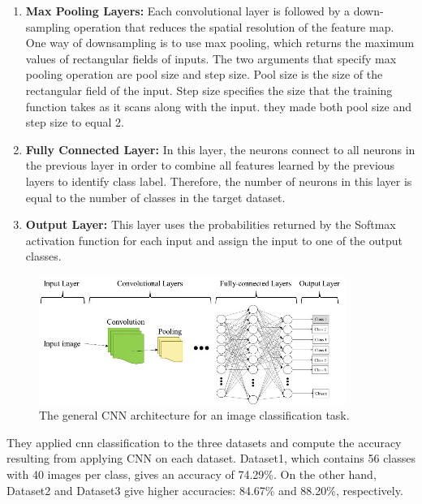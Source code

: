 \begin{itemize}[labelindent=1em,labelsep=0.25cm,leftmargin=*]
\begin{enumerate}
        \item {\textbf{Max Pooling Layers:}} 
Each convolutional layer is
followed by a down-sampling operation that reduces the
spatial resolution of the feature map. One way of downsampling
is to use max pooling, which returns the maximum
values of rectangular fields of inputs. The two arguments that
specify max pooling operation are pool size and step size.
Pool size is the size of the rectangular field of the input. Step
size specifies the size that the training function takes as it
scans along with the input. they made both pool size and step size
to equal 2.

        \item {\textbf{Fully Connected Layer:}} 
In this layer, the neurons
connect to all neurons in the previous layer in order to
combine all features learned by the previous layers to identify
class label. Therefore, the number of neurons in this layer is
equal to the number of classes in the target dataset.

        \item {\textbf{Output Layer:}} 
This layer uses the probabilities
returned by the Softmax activation function for each input
and assign the input to one of the output classes.
        \end{enumerate}
        
        \begin{figure}[!htb]
        \centering
        \includegraphics[width=10cm]{images/cnn_leyar.png}
        \caption{The general CNN architecture for an image classification task.}
        \label{fig:cnn_leyar}
        \end{figure}
        
    \end{itemize}
They applied \acrshort{cnn} classification to the three datasets and
compute the accuracy resulting from applying CNN on each
dataset. Dataset1, which contains 56 classes with 40 images
per class, gives an accuracy of 74.29\%. On the other hand,
Dataset2 and Dataset3 give higher accuracies: 84.67\% and
88.20\%, respectively.

